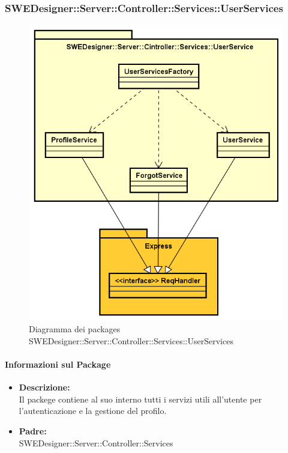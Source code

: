 		\subsubsection{SWEDesigner::Server::Controller::Services::UserServices}
		\begin{figure}[h!]
		\centering
		\includegraphics[scale=0.4]{Disegnetti/SWEDesigner__Server__Controller__Services__UserService.png}
		\caption{Diagramma dei packages SWEDesigner::Server::Controller::Services::UserServices}
 		\end{figure}
		\paragraph{Informazioni sul Package}
		\begin{itemize}
			\item \textbf{Descrizione: }\\
			Il packege contiene al suo interno tutti i servizi utili all'utente per l'autenticazione e la gestione del profilo.
			\item \textbf{Padre: }\\ SWEDesigner::Server::Controller::Services

		\end{itemize}
